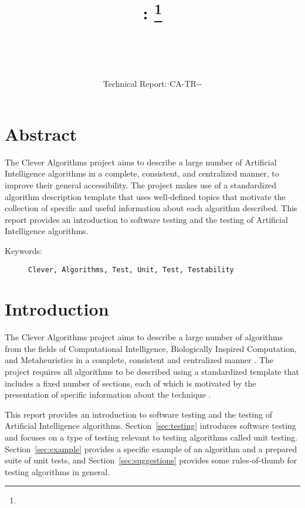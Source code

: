 \documentclass[a4paper, 11pt]{article}
\title{{\myreporttitle}: {\myreportsubtitle}\footnote{\myreportlicense}}
\author{\myreportauthor\\{\myreportemail}\\\small\myreportproject}
\date{\myreportfulldate\\{\small{Technical Report: CA-TR-{\myreportdate}-\myreportversion}}}
\begin{document}
\maketitle

\section*{Abstract} 
The Clever Algorithms project aims to describe a large number of Artificial Intelligence algorithms in a complete, consistent, and centralized manner, to improve their general accessibility. 
The project makes use of a standardized algorithm description template that uses well-defined topics that motivate the collection of specific and useful information about each algorithm described.
This report provides an introduction to software testing and the testing of Artificial Intelligence algorithms.

\begin{description}
	\item[Keywords:] {\small\texttt{Clever, Algorithms, Test, Unit, Test, Testability}}
\end{description} 

\section{Introduction}
\label{sec:introduction}
The Clever Algorithms project aims to describe a large number of algorithms from the fields of Computational Intelligence, Biologically Inspired Computation, and Metaheuristics in a complete, consistent and centralized manner \cite{Brownlee2010}.
The project requires all algorithms to be described using a standardized template that includes a fixed number of sections, each of which is motivated by the presentation of specific information about the technique \cite{Brownlee2010a}.

This report provides an introduction to software testing and the testing of Artificial Intelligence algorithms. Section~\ref{sec:testing} introduces software testing and focuses on a type of testing relevant to testing algorithms called unit testing. Section~\ref{sec:example} provides a specific example of an algorithm and a prepared suite of unit tests, and Section~\ref{sec:suggestions} provides some rules-of-thumb for testing algorithms in general.
\end{document}
